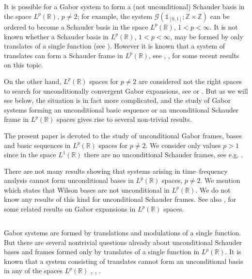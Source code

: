 \documentclass[reqno,a4paper,12pt]{amsart}
\numberwithin{equation}{section}
\numberwithin{figure}{section}
\newcommand\R{\mathbb{R}}
\newcommand\Z{\mathbb{Z}}
\newcommand\G{\mathcal{G}}
\newcommand\1{\mathds{1}}
\theoremstyle{plain}
\theoremstyle{definition}
\begin{document}
\subsection{}
It is possible for a Gabor system to form a (not unconditional) Schauder basis in the space $L^p(\R)$, $p\neq 2$; for example, the system $\G(\1_{[0,1]}; \Z\times\Z)$ can be ordered to become a Schauder basis in the space $L^p(\R)$, $1 < p < \infty$. It is not known whether a Schauder basis in $L^p(\R)$, $1<p<\infty$, may be formed by only translates of a single function (see \cite[Problem 4.4]{OSSZ11}). However it is known that a system of translates can form a Schauder frame in $L^p(\R)$, see \cite[Section 4]{FPT21}, \cite{LT26a}, \cite{LT26b} for some recent results on this topic.


On the other hand, $L^p(\R)$ spaces for $p\neq 2$ are considered not the right spaces to search for unconditionally convergent Gabor expansions, see \cite[Section 24.5]{Chr16} or \cite{GH01}. But as we will see below, the situation is in fact more complicated, and the study of Gabor systems forming an unconditional basic sequence or an unconditional Schauder frame in $L^p(\R)$ spaces gives rise to several non-trivial results.


The present paper is devoted to the study of unconditional Gabor frames, bases and basic sequences in $L^p(\R)$ spaces for $p\neq 2$. We consider only values $p > 1$ since in the space $L^1(\R)$ 
there are no unconditional Schauder frames, see e.g. \cite[Section 4.3]{BC20}.

There are not many results showing that systems arising in time--frequency analysis cannot form unconditional bases in $L^p(\R)$ spaces, $p\neq 2$. We mention \cite[Theorem 2]{FGW92} which states that Wilson bases are not unconditional in $L^p(\R)$. We do not know any results of this kind for unconditional Schauder frames. See also \cite{GH01}, \cite{GL01} for some related results on Gabor expansions in $L^p(\R)$ spaces.

\subsection{}
Gabor systems are formed by translations and modulations of a single function. But there are several nontrivial questions already about unconditional Schauder bases and frames formed only by translates of a single function in $L^p(\R)$. It  is known that a system consisting of translates cannot form an unconditional basis in any of the spaces $L^p(\mathbb{R})$ \cite{OZ92}, \cite{OSSZ11}, \cite{FOSZ14}.
\end{document}
